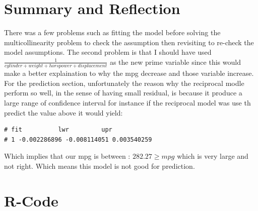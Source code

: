 \documentclass[11pt]{article} %
\begin{document}
\section{Summary and Reflection}
There was a few problems such as fitting the model before solving the multicollinearity problem to check the assumption then revisiting to re-check the model assumptions. The second problem is that I should have used $\frac{1}{cylinder+weight+horspower+displacement}$ as the new prime variable since this would make a better explaination to why the mpg decrease and those variable increase. For the prediction section, unfortunately the reason why the reciprocal modle perform so well, in the sense of having small residual, is because it produce a large range of confidence interval for instance if the reciprocal model was use th predict the value above it would yield:
\begin{lstlisting}
# fit          lwr         upr
# 1 -0.002286896 -0.008114051 0.003540259
\end{lstlisting}
Which implies that our mpg is between : $282.27 \geq mpg$ which is very large and not right. Which means this model is not good for prediction.
\newpage
\section{R-Code}
\end{document}
